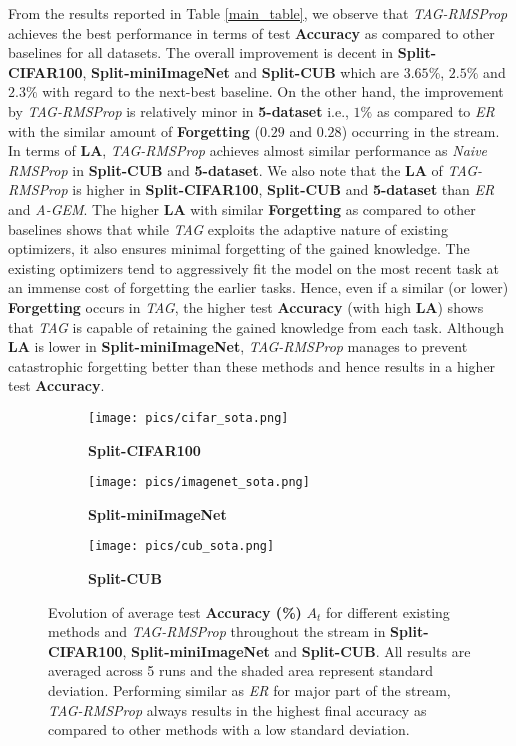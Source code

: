 \documentclass{article} \usepackage{collas2022_conference,times}
\begin{document}
	From the results reported in Table \ref{main_table}, we observe that \textit{TAG-RMSProp} achieves the best performance in terms of test \textbf{Accuracy} as compared to other baselines for all datasets. The overall improvement is decent in \textbf{Split-CIFAR100}, \textbf{Split-miniImageNet} and \textbf{Split-CUB} which are $3.65\%$, $2.5\%$ and $2.3\%$ with regard to the next-best baseline. On the other hand, the improvement by \textit{TAG-RMSProp} is relatively minor in \textbf{5-dataset} i.e., $1\%$ as compared to \textit{ER} with the similar amount of \textbf{Forgetting} ($0.29$ and $0.28$) occurring in the stream. In terms of \textbf{LA}, \textit{TAG-RMSProp} achieves almost similar performance as \textit{Naive RMSProp} in \textbf{Split-CUB} and \textbf{5-dataset}. We also note that the \textbf{LA} of \textit{TAG-RMSProp} is higher in \textbf{Split-CIFAR100}, \textbf{Split-CUB} and \textbf{5-dataset} than \textit{ER} and \textit{A-GEM}. 
The higher \textbf{LA} with similar \textbf{Forgetting} as compared to other baselines shows that while \textit{TAG} exploits the adaptive nature of existing optimizers, it also ensures minimal forgetting of the gained knowledge. The existing optimizers tend to aggressively fit the model on the most recent task at an immense cost of forgetting the earlier tasks. Hence, even if a similar (or lower) \textbf{Forgetting} occurs in \textit{TAG}, the higher test \textbf{Accuracy} (with high \textbf{LA}) shows that \textit{TAG} is capable of retaining the gained knowledge from each task. Although \textbf{LA} is lower in \textbf{Split-miniImageNet}, \textit{TAG-RMSProp} manages to prevent catastrophic forgetting better than these methods and hence results in a higher test \textbf{Accuracy}.


    \begin{figure*}[t!]
        \centering
        \begin{subfigure}[b]{0.3\textwidth}
            \texttt{[image: pics/cifar\_sota.png]}
            \caption{\textbf{Split-CIFAR100}}
        \end{subfigure}
        \hfill
        \begin{subfigure}[b]{0.3\textwidth}
            \texttt{[image: pics/imagenet\_sota.png]}
            \caption{\textbf{Split-miniImageNet}}
        \end{subfigure}
        \hfill
        \begin{subfigure}[b]{0.3\textwidth}
            \texttt{[image: pics/cub\_sota.png]}
            \caption{\textbf{Split-CUB}}
        \end{subfigure}
        \caption{Evolution of average test \textbf{Accuracy (\%)} $A_t$ for different existing methods and \textit{TAG-RMSProp} throughout the stream in \textbf{Split-CIFAR100}, \textbf{Split-miniImageNet} and \textbf{Split-CUB}. All results are averaged across 5 runs and the shaded area represent standard deviation. Performing similar as \textit{ER} for major part of the stream, \textit{TAG-RMSProp} always results in the highest final accuracy as compared to other methods with a low standard deviation.}
        \label{sota_fig}
    \end{figure*}
\end{document}
